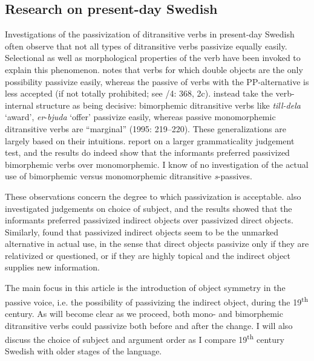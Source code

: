 \documentclass[output=paper]{langscibook}
\begin{document}
\subsection{Research on present-day Swedish}\label{sec:falk:2.1}


Investigations of the passivization of ditransitive verbs in present-day Swedish often observe that not all types of ditransitive verbs passivize equally easily. Selectional as well as morphological properties of the verb have been invoked to explain this phenomenon. \citet{Anward1989} notes that verbs for which double objects are the only possibility passivize easily, whereas the passive of verbs with the PP-alternative is less accepted (if not totally prohibited; see \citealt{TelemanEtAl1999}/4: 368, 2c). \citet{HolmbergPlatzack1995} instead take the verb-internal structure as being decisive: bimorphemic ditransitive verbs like \textit{till-dela} ‘award’, \textit{er}{}-\textit{bjuda} ‘offer’ passivize easily, whereas passive monomorphemic ditransitive verbs are “marginal” (1995: 219–220). These generalizations are largely based on their intuitions. \citet{HaddicanHolmberg2019} report on a larger grammaticality judgement test, and the results do indeed show that the informants preferred passivized bimorphemic verbs over monomorphemic. I know of no investigation of the actual use of bimorphemic versus monomorphemic ditransitive \textit{s}{}-passives.


These observations concern the degree to which passivization is acceptable. \citet{HaddicanHolmberg2019} also investigated judgements on choice of subject, and the results showed that the informants preferred passivized indirect objects over passivized direct objects. Similarly, \citet{Lundquist2004} found that passivized indirect objects seem to be the unmarked alternative in actual use, in the sense that direct objects passivize only if they are relativized or questioned, or if they are highly topical and the indirect object supplies new information.



The main focus in this article is the introduction of object symmetry in the passive voice, i.e. the possibility of passivizing the indirect object, during the 19\textsuperscript{th} century. As will become clear as we proceed, both mono- and bimorphemic ditransitive verbs could passivize both before and after the change. I will also discuss the choice of subject and argument order as I compare 19\textsuperscript{th} century Swedish with older stages of the language.
\end{document}
